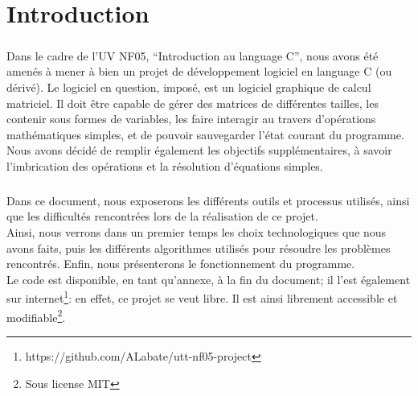 \chapter{Introduction}
    \paragraph{}
        Dans le cadre de l'UV NF05, ``Introduction au language C'', nous avons été amenés à mener à bien un projet de développement logiciel en language C (ou dérivé).
        Le logiciel en question, imposé, est un logiciel graphique de calcul matriciel. Il doit être capable de gérer des matrices de différentes tailles,
        les contenir sous formes de variables, les faire interagir au travers d'opérations mathématiques simples, et de pouvoir sauvegarder l'état courant du programme.
        Nous avons décidé de remplir également les objectifs supplémentaires, à savoir l'imbrication des opérations et la résolution d'équations simples.
    
    \paragraph{}
        Dans ce document, nous exposerons les différents outils et processus utilisés, ainsi que les difficultés rencontrées lors de la réalisation de ce
        projet.\\ 
        Ainsi, nous verrons dans un premier temps les choix technologiques que nous avons faits, puis les différents algorithmes utilisés pour résoudre
        les problèmes rencontrés. Enfin, nous présenterons le fonctionnement du programme.\\
        Le code est disponible, en tant qu'annexe, à la fin du document; il l'est également sur internet\footnote{https://github.com/ALabate/utt-nf05-project}: en effet, ce projet se veut libre. Il est ainsi librement accessible et modifiable\footnote{Sous license MIT}.